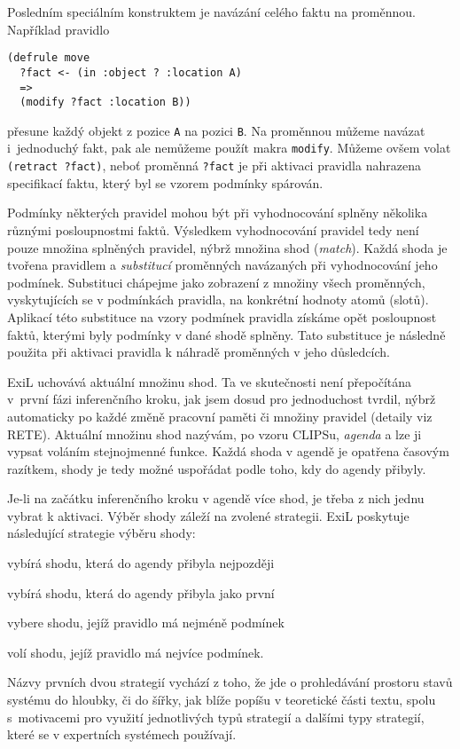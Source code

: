 Posledním speciálním konstruktem je navázání celého faktu na proměnnou.
Například pravidlo
\begin{verbatim}
(defrule move
  ?fact <- (in :object ? :location A)
  =>
  (modify ?fact :location B))
\end{verbatim}
přesune každý objekt z pozice \verb|A| na pozici \verb|B|. Na proměnnou
můžeme navázat i~jednoduchý fakt, pak ale nemůžeme použít makra \verb|modify|.
Můžeme ovšem volat \verb|(retract ?fact)|, neboť proměnná \verb|?fact| je při
aktivaci pravidla nahrazena specifikací faktu, který byl se vzorem podmínky
spárován.

Podmínky některých pravidel mohou být při vyhodnocování splněny několika různými
posloupnostmi faktů. Výsledkem vyhodnocování pravidel tedy není pouze množina
splněných pravidel, nýbrž množina shod (\emph{match}). Každá shoda je tvořena
pravidlem a \emph{substitucí} proměnných navázaných při vyhodnocování jeho
podmínek. Substituci chápejme jako zobrazení z množiny všech proměnných,
vyskytujících se v podmínkách pravidla, na konkrétní hodnoty atomů (slotů).
Aplikací této substituce na vzory podmínek pravidla získáme opět posloupnost
faktů, kterými byly podmínky v dané shodě splněny. Tato substituce je následně
použita při aktivaci pravidla k náhradě proměnných v jeho důsledcích.

ExiL uchovává aktuální množinu shod. Ta ve skutečnosti není přepočítána v~první
fázi inferenčního kroku, jak jsem dosud pro jednoduchost tvrdil, nýbrž
automaticky po každé změně pracovní paměti či množiny pravidel (detaily viz
RETE). Aktuální množinu shod nazývám, po vzoru CLIPSu, \emph{agenda} a lze ji
vypsat voláním stejnojmenné funkce. Každá shoda v agendě je opatřena časovým
razítkem, shody je tedy možné uspořádat podle toho, kdy do agendy přibyly.

Je-li na začátku inferenčního kroku v agendě více shod, je třeba z nich jednu
vybrat k aktivaci. Výběr shody záleží na zvolené strategii. ExiL poskytuje
následující strategie výběru shody:
\begin{description}[leftmargin=5cm,style=sameline,align=right,labelsep=0.5cm]
  \item[depth-strategy] vybírá shodu, která do agendy přibyla nejpozději
  \item[breadth-strategy] vybírá shodu, která do agendy přibyla jako první
  \item[simplicity-strategy] vybere shodu, jejíž pravidlo má nejméně podmínek
  \item[complexity-strategy] volí shodu, jejíž pravidlo má nejvíce podmínek.
\end{description}
Názvy prvních dvou strategií vychází z toho, že jde o prohledávání prostoru
stavů systému do hloubky, či do šířky, jak blíže popíšu v teoretické části
textu, spolu s~motivacemi pro využití jednotlivých typů strategií a dalšími typy
strategií, které se v expertních systémech používají.

